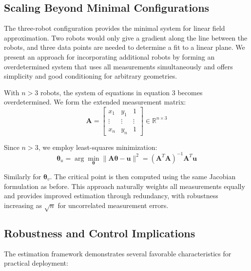 \documentclass[lettersize,journal]{IEEEtran}
\begin{document}
\subsection{Scaling Beyond Minimal Configurations}

The three-robot configuration provides the minimal system for linear field approximation. Two robots would only give a gradient along the line between the robots, and three data points are needed to determine a fit to a linear plane. We present an approach for incorporating additional robots by forming an overdetermined system that uses all measurements simultaneously and offers simplicity and good conditioning for arbitrary geometries.

With $n > 3$ robots, the system of equations in equation 3 becomes overdetermined. We form the extended measurement matrix:
\begin{equation}
\mathbf{A} = \begin{bmatrix} x_1 & y_1 & 1 \\ \vdots & \vdots & \vdots \\ x_n & y_n & 1 \end{bmatrix} \in \mathbb{R}^{n \times 3}
\end{equation}

Since $n > 3$, we employ least-squares minimization:
\begin{equation}
\boldsymbol{\theta}_u = \arg\min_{\boldsymbol{\theta}} \|\mathbf{A}\boldsymbol{\theta} - \mathbf{u}\|^2 = (\mathbf{A}^T\mathbf{A})^{-1}\mathbf{A}^T\mathbf{u}
\end{equation}

Similarly for $\boldsymbol{\theta}_v$. The critical point is then computed using the same Jacobian formulation as before. This approach naturally weights all measurements equally and provides improved estimation through redundancy, with robustness increasing as $\sqrt{n}$ for uncorrelated measurement errors.

\subsection{Robustness and Control Implications}

The estimation framework demonstrates several favorable characteristics for practical deployment:
\end{document}
